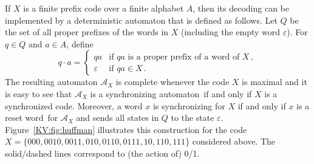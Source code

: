 \documentclass{irmaart}
\newcommand{\san}{synchronizing au\-tom\-a\-ton}
\newcommand{\sw}{reset word}
\begin{document}
If $X$ is a finite prefix code over a finite alphabet $A$, then its decoding
can be implemented by a deterministic automaton that is defined as follows.
Let $Q$ be the set of all proper prefixes of the words in $X$ (including the empty word
$\varepsilon$). For $q\in Q$ and $a\in A$, define
\begin{displaymath}
q\cdot a =\begin{cases} qa & \text{if $qa$ is a proper prefix of a word of $X$}\,,\\
\varepsilon & \text{if $qa \in X$}\,.\end{cases}
\end{displaymath}
The resulting automaton $\mathcal{A}_X$ is complete whenever the code $X$
is maximal and it is easy to see that $\mathcal{A}_X$ is a \san\ if and only
if $X$ is a synchronized code. Moreover, a word $x$ is synchronizing for $X$
if and only if $x$ is a \sw\ for $\mathcal{A}_X$ and sends all states in $Q$
to the state $\varepsilon$. Figure~\ref{KV:fig:huffman} illustrates this construction
for the code $X=\{000,0010,0011,010,0110,0111,10,110,111\}$ considered above.
The solid/dashed lines correspond to (the action of) 0/1.
\end{document}
